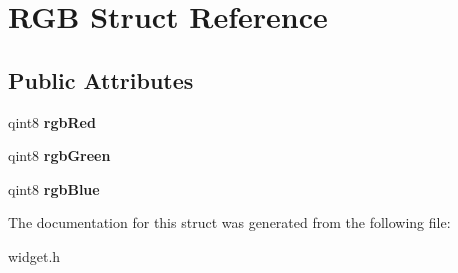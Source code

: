 \hypertarget{structRGB}{}\section{R\+G\+B Struct Reference}
\label{structRGB}
\subsection*{Public Attributes}
\begin{DoxyCompactItemize}
\item 
\hypertarget{structRGB_a693caaf012a4d7abe86cb4e7fd0c8d1a}{}qint8 {\bfseries rgb\+Red}\label{structRGB_a693caaf012a4d7abe86cb4e7fd0c8d1a}

\item 
\hypertarget{structRGB_ada9e931ab349e34398449e2ac1c9162b}{}qint8 {\bfseries rgb\+Green}\label{structRGB_ada9e931ab349e34398449e2ac1c9162b}

\item 
\hypertarget{structRGB_a382f19b3318018ffd99836273ae9ad88}{}qint8 {\bfseries rgb\+Blue}\label{structRGB_a382f19b3318018ffd99836273ae9ad88}

\end{DoxyCompactItemize}


The documentation for this struct was generated from the following file\+:\begin{DoxyCompactItemize}
\item 
widget.\+h\end{DoxyCompactItemize}
